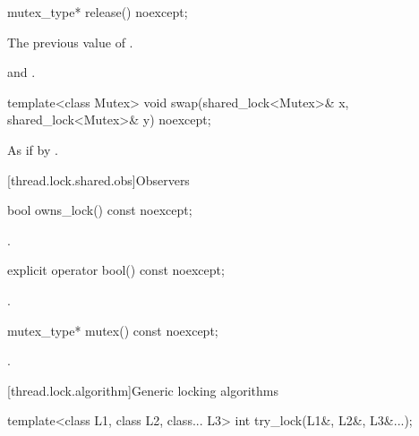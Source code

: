 %
\begin{itemdecl}
mutex_type* release() noexcept;
\end{itemdecl}

\begin{itemdescr}
\pnum
\returns
The previous value of .

\pnum
\ensures
{} and .
\end{itemdescr}

%
\begin{itemdecl}
template<class Mutex>
  void swap(shared_lock<Mutex>& x, shared_lock<Mutex>& y) noexcept;
\end{itemdecl}

\begin{itemdescr}
\pnum
\effects
As if by .
\end{itemdescr}

[thread.lock.shared.obs]{Observers}

%
\begin{itemdecl}
bool owns_lock() const noexcept;
\end{itemdecl}

\begin{itemdescr}
\pnum
\returns
{}.
\end{itemdescr}

%
\begin{itemdecl}
explicit operator bool() const noexcept;
\end{itemdecl}

\begin{itemdescr}
\pnum
\returns
{}.
\end{itemdescr}

%
\begin{itemdecl}
mutex_type* mutex() const noexcept;
\end{itemdecl}

\begin{itemdescr}
\pnum
\returns
{}.
\end{itemdescr}

[thread.lock.algorithm]{Generic locking algorithms}

%
\begin{itemdecl}
template<class L1, class L2, class... L3> int try_lock(L1&, L2&, L3&...);
\end{itemdecl}

